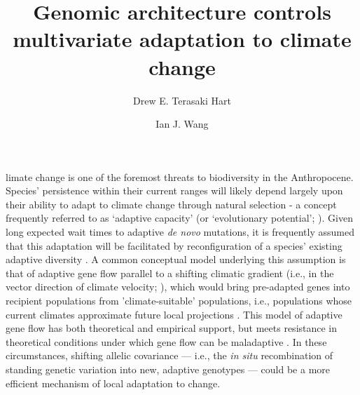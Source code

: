 \documentclass[9pt,twocolumn,twoside,lineno]{pnas-new}
\title{Genomic architecture controls multivariate adaptation to climate change}
\author[a,1]{Drew E. Terasaki Hart}
\author[a]{Ian J. Wang}
\affil[a]{Department of Environmental Science, Policy, and Management, University of California, Berkeley, CA 94720}
\begin{document}
\maketitle
\thispagestyle{firststyle}




limate change is one of the foremost threats to biodiversity in the Anthropocene.
Species’ persistence within their current ranges will likely depend largely upon their ability to
adapt to climate change through natural selection - a concept frequently referred to 
as `adaptive capacity’ (or `evolutionary potential’;
\cite{chevin,harrisson,nicotra,vilas,wade}).
Given long expected wait times to adaptive \textit{de novo} mutations,
it is frequently assumed that this adaptation will be facilitated
by reconfiguration of a species' existing adaptive diversity \cite{bomblies}.
A common conceptual model underlying this assumption is that of
adaptive gene flow parallel to a shifting climatic gradient
(i.e., in the vector
direction of climate velocity; \cite{ackerly}),
which would bring pre-adapted genes into recipient populations
from 'climate-suitable' populations, i.e., populations whose
current climates approximate future local projections \cite{bellis}.
This model of adaptive gene flow has both theoretical
\cite{aitken_whitlock,slatkin,tigano}
and empirical 
\cite{feder,bell}
support,
but meets resistance in theoretical conditions under which gene flow can be maladaptive
\cite{wang,lenormand,slatkin,haldane,wright,felsenstein}.
In these circumstances, shifting allelic covariance --- 
i.e., the \textit{in situ} recombination of standing genetic variation into new,
adaptive genotypes --- could be a more efficient mechanism of local adaptation to change.
\end{document}
